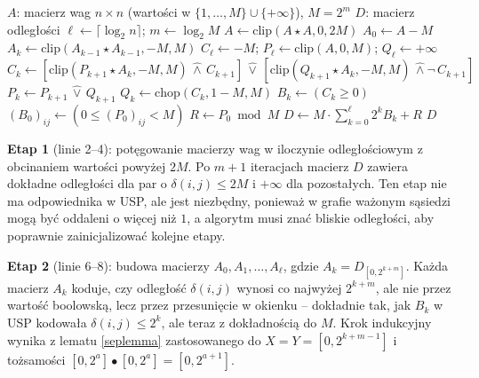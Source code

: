 \begin{algorithm}
\caption{WUSP -- APSP w grafie ważonym nieskierowanym}
\label{alg:wusp}
\begin{algorithmic}[1]
\Require $A$: macierz wag $n \times n$ (wartości w $\{1,\ldots,M\} \cup \{+\infty\}$), $M = 2^m$
\Ensure $D$: macierz odległości
\State $\ell \leftarrow \lceil \log_2 n \rceil$; $m \leftarrow \log_2 M$
  \State $A \leftarrow \mathrm{clip}(A \star A, 0, 2M)$
\EndFor
\State $A_0 \leftarrow A - M$
  \State $A_k \leftarrow \mathrm{clip}(A_{k-1} \star A_{k-1}, -M, M)$
\EndFor
\State $C_\ell \leftarrow -M$; $P_\ell \leftarrow \mathrm{clip}(A, 0, M)$; $Q_\ell \leftarrow +\infty$
  \State $C_k \leftarrow [\mathrm{clip}(P_{k+1} \star A_k, -M, M) \,\hat{\wedge}\, C_{k+1}] \,\hat{\vee}\, [\mathrm{clip}(Q_{k+1} \star A_k, -M, M) \,\hat{\wedge}\neg\, C_{k+1}]$
  \State $P_k \leftarrow P_{k+1} \,\hat{\vee}\, Q_{k+1}$
  \State $Q_k \leftarrow \mathrm{chop}(C_k, 1-M, M)$
\EndFor
{}
  \State $B_k \leftarrow (C_k \geq 0)$
\EndFor
\State $(B_0)_{ij} \leftarrow (0 \leq (P_0)_{ij} < M)$
\State $R \leftarrow P_0 \bmod M$
\State $D \leftarrow M \cdot \sum_{k=0}^{\ell} 2^k B_k + R$
\State \Return $D$
\end{algorithmic}
\end{algorithm}

\textbf{Etap 1} (linie 2--4): potęgowanie macierzy wag w iloczynie odległościowym z obcinaniem wartości powyżej $2M$. Po $m+1$ iteracjach macierz $D$ zawiera dokładne odległości dla par o $\delta(i,j) \leq 2M$ i $+\infty$ dla pozostałych. Ten etap nie ma odpowiednika w USP, ale jest niezbędny, ponieważ w grafie ważonym sąsiedzi mogą być oddaleni o więcej niż $1$, a algorytm musi znać bliskie odległości, aby poprawnie zainicjalizować kolejne etapy.

\textbf{Etap 2} (linie 6--8): budowa macierzy $A_0, A_1, \ldots, A_\ell$, gdzie $A_k = D_{[0, 2^{k+m}]}$. Każda macierz $A_k$ koduje, czy odległość $\delta(i,j)$ wynosi co najwyżej $2^{k+m}$, ale nie przez wartość boolowską, lecz przez przesunięcie w okienku -- dokładnie tak, jak $B_k$ w USP kodowała $\delta(i,j) \leq 2^k$, ale teraz z dokładnością do $M$. Krok indukcyjny wynika z lematu \ref{seplemma} zastosowanego do $X = Y = [0, 2^{k+m-1}]$ i tożsamości $[0, 2^a] \bullet [0, 2^a] = [0, 2^{a+1}]$.

